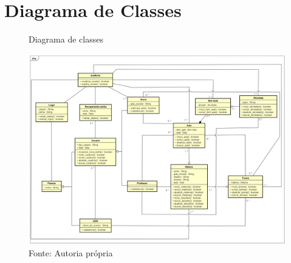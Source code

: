 \documentclass{utfpr-pg}
\begin{document}
\chapter{Diagrama de Classes}
    \begin{figure}[H]
        \centering
        \captionsetup{width=0.9\textwidth}
        \caption{Diagrama de classes}
        \includegraphics[width=\linewidth]{fotos/Diagrama de classe.png}
        \caption*{Fonte: Autoria própria}
        \label{fig:Diagrama de Classes}
    \end{figure}

\end{document}
